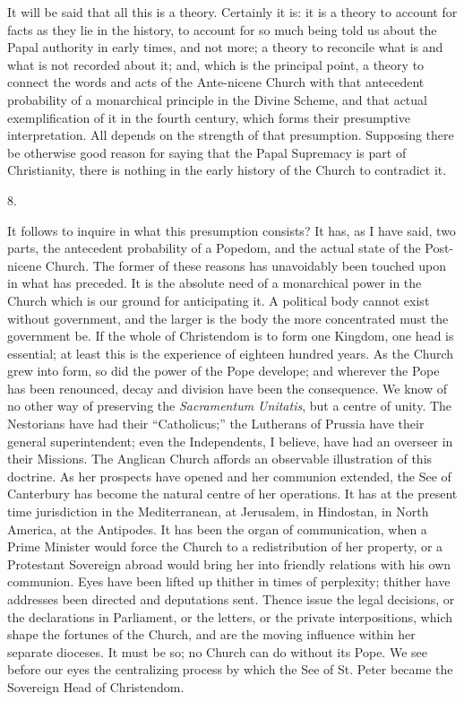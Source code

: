 It will be said that all this is a theory. Certainly
it is: it is a theory to account for facts as they lie in
the history, to account for so much being told us about
the Papal authority in early times, and not more; a
theory to reconcile what is and what is not recorded
about it; and, which is the principal point, a theory to
connect the words and acts of the Ante-nicene Church with
that antecedent probability of a monarchical principle in
the Divine Scheme, and that actual exemplification of it
in the fourth century, which forms their presumptive
interpretation. All depends on the strength of that
presumption. Supposing there be otherwise good reason for
saying that the Papal Supremacy is part of Christianity,
there is nothing in the early history of the Church to
contradict it.

8.

It follows to inquire in what this presumption
consists? It has, as I have said, two parts, the
antecedent probability of a Popedom, and the actual state
of the Post-nicene Church. The former of these reasons
has unavoidably been touched upon in what has preceded.
It is the absolute need of a monarchical power in the
Church which is our ground for anticipating it. A
political body cannot exist without government, and the
larger is the body the more concentrated must the
government be. If the whole of Christendom is to form one
Kingdom, one head is essential; at least this is the
experience of eighteen hundred years. As the Church grew
into form, so did the power of the Pope develope; and
wherever the Pope has been renounced, decay and division
have been the consequence. We know of no other way of
preserving the \emph{Sacramentum Unitatis}, but a centre
of unity. The Nestorians have had their
``Catholicus;'' the Lutherans of Prussia have
their general superintendent; even the Independents, I
believe, have had an overseer in their Missions. The
Anglican Church affords an observable illustration of
this doctrine. As her prospects have opened and her
communion extended, the See of Canterbury has become the
natural centre of her operations. It has at the present
time jurisdiction in the Mediterranean, at Jerusalem, in
Hindostan, in North America, at the Antipodes. It has
been the organ of communication, when a Prime Minister
would force the Church to a redistribution of her
property, or a Protestant Sovereign abroad would bring
her into friendly relations with his own communion. Eyes
have been lifted up thither in times of perplexity;
thither have addresses been directed and deputations
sent. Thence issue the legal decisions, or the
declarations in Parliament, or the letters, or the
private interpositions, which shape the fortunes of the
Church, and are the moving influence within her separate
dioceses. It must be so; no Church can do without its
Pope. We see before our eyes the centralizing process by
which the See of St. Peter became the Sovereign Head of
Christendom.

